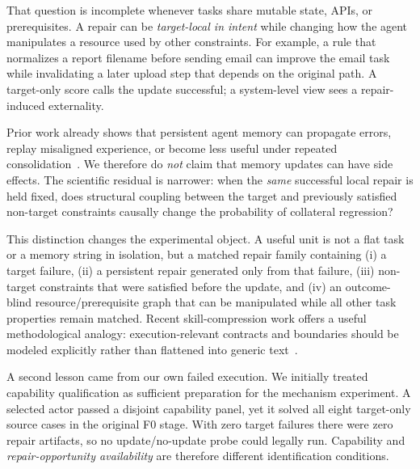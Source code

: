 \documentclass{article}
\begin{document}
That question is incomplete whenever tasks share mutable state, APIs, or prerequisites. A repair can be \emph{target-local in intent} while changing how the agent manipulates a resource used by other constraints. For example, a rule that normalizes a report filename before sending email can improve the email task while invalidating a later upload step that depends on the original path. A target-only score calls the update successful; a system-level view sees a repair-induced externality.

Prior work already shows that persistent agent memory can propagate errors, replay misaligned experience, or become less useful under repeated consolidation~\citep{xiong2026memory,zhang2026faultymemory}. We therefore do \emph{not} claim that memory updates can have side effects. The scientific residual is narrower: when the \emph{same} successful local repair is held fixed, does structural coupling between the target and previously satisfied non-target constraints causally change the probability of collateral regression?

This distinction changes the experimental object. A useful unit is not a flat task or a memory string in isolation, but a matched repair family containing (i) a target failure, (ii) a persistent repair generated only from that failure, (iii) non-target constraints that were satisfied before the update, and (iv) an outcome-blind resource/prerequisite graph that can be manipulated while all other task properties remain matched. Recent skill-compression work offers a useful methodological analogy: execution-relevant contracts and boundaries should be modeled explicitly rather than flattened into generic text~\citep{bai2026skillzip,bai2026skillzippro}.

A second lesson came from our own failed execution. We initially treated capability qualification as sufficient preparation for the mechanism experiment. A selected actor passed a disjoint capability panel, yet it solved all eight target-only source cases in the original F0 stage. With zero target failures there were zero repair artifacts, so no update/no-update probe could legally run. Capability and \emph{repair-opportunity availability} are therefore different identification conditions.
\end{document}

